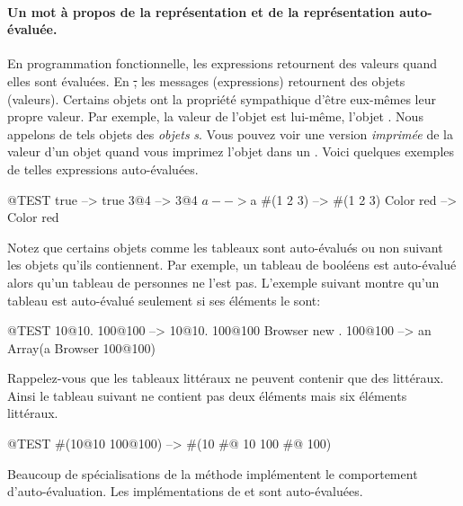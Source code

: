 \documentclass[a4paper,10pt,twoside]{book}
\begin{document}
\paragraph{Un mot à propos de la représentation et de la représentation auto-évaluée.}
En programmation fonctionnelle, les expressions retournent des valeurs
quand elles sont évaluées. En \st, les messages (expressions)
retournent des objets (valeurs). Certains objets ont la propriété
sympathique d'être eux-mêmes leur propre valeur. Par exemple, la
valeur de l'objet  est lui-même, \ie l'objet
. Nous appelons de tels objets des \emph{objets}
\emph{s}. 
Vous pouvez voir une version  \emph{imprimée} de la valeur d'un objet 
quand vous imprimez l'objet dans un . Voici quelques exemples 
de telles expressions auto-évaluées. 

\begin{code}{@TEST}
true      --> true
3@4       --> 3@4
$a        --> $a
#(1 2 3)  --> #(1 2 3)
Color red --> Color red
\end{code} %

Notez que certains objets comme les tableaux sont auto-évalués ou
non suivant les objets qu'ils contiennent. Par exemple, un tableau de
booléens est auto-évalué alors qu'un tableau de personnes ne
l'est pas.
L'exemple suivant montre qu'un tableau  est
auto-évalué seulement si ses éléments le sont:
\begin{code}{@TEST}
{10@10. 100@100}          --> {10@10. 100@100}
{Browser new . 100@100}    --> an Array(a Browser 100@100)
\end{code}

Rappelez-vous que les tableaux littéraux ne peuvent contenir que des littéraux. Ainsi le tableau suivant ne contient pas deux éléments mais six éléments littéraux.
\begin{code}{@TEST}
#(10@10 100@100) --> #(10 #@ 10 100 #@ 100)
\end{code}

Beaucoup de spécialisations de la méthode  implémentent le comportement d'auto-évaluation. Les implémentations de  et  sont auto-évaluées.
\end{document}
